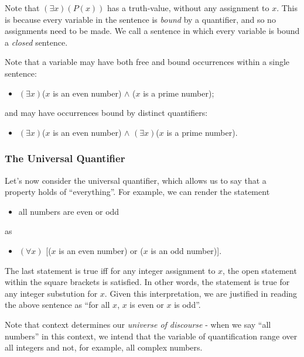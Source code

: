 Note that $(\exists x)(P(x))$ has a truth-value, without any assignment to $x$. This is because every variable in the sentence is \emph{bound} by a quantifier, and so no assignments need to be made. 
We call a sentence in which every variable is bound a \emph{closed} sentence. 
\iffalse
\begin{aside}
    In the sentence $(\exists x)(F(x)) \land x > 3$, the first occurrence of $x$ is bound, whereas the second is not. As such, the two instances of $x$ \emph{may refer to different elements of our universe}. In other words, the sentence is equivalent to $(\exists x)(F(x)) \land y > 3$, which makes it clear that the sentence is still open (since it needs an assignment to $y$ to have a truth-value). 
\end{aside}
\fi
Note that a variable may have both free and bound occurrences within a single sentence:
\begin{itemize}
\item $(\exists x)$($x$ is an even number) $\wedge$ ($x$ is a prime number); \end{itemize}
and may have occurrences bound by distinct quantifiers: 
\begin{itemize}
\item $(\exists x)$($x$ is an even number) $\wedge$ $(\exists x)$($x$ is a prime number).
\end{itemize} 


\subsubsection*{The Universal Quantifier}
Let's now consider the universal quantifier, which allows us to say that a property holds of ``everything''. For example, we can render the statement
\begin{itemize}
\item all numbers are even or odd
\end{itemize}
as
\begin{itemize}
\item $(\forall x)$ [($x$ is an even number) or ($x$ is an odd number)].
\end{itemize}
The last statement is true iff for any integer assignment to $x$, the open statement within the square brackets is satisfied. In other words, the statement is true for any integer substution for $x$. Given this interpretation, we are justified in reading the above sentence as ``for all $x$, $x$ is even or $x$ is odd''. 

Note that context determines our \emph{universe of discourse} - when we say ``all numbers'' in this context, we intend that the variable of quantification range over all integers and not, for example, all complex numbers.


